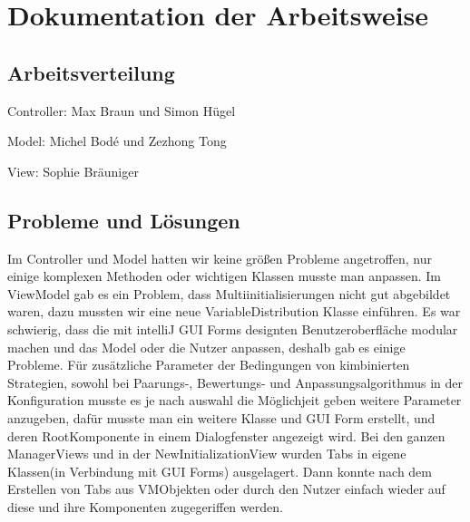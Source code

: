 \section{Dokumentation der Arbeitsweise}


\subsection{Arbeitsverteilung}

Controller: Max Braun und Simon Hügel

Model: Michel Bodé und Zezhong Tong

View: Sophie Bräuniger

\subsection{Probleme und Lösungen}

Im Controller und Model hatten wir keine größen Probleme angetroffen, nur einige komplexen Methoden oder wichtigen Klassen musste man anpassen. Im ViewModel gab es ein Problem, dass Multiinitialisierungen nicht gut abgebildet waren, dazu mussten wir eine neue VariableDistribution Klasse einführen. Es war schwierig, dass die mit intelliJ GUI Forms designten Benutzeroberfläche modular machen und das Model oder die Nutzer anpassen, deshalb gab es einige Probleme. Für zusätzliche Parameter der Bedingungen von kimbinierten Strategien, sowohl bei Paarungs-, Bewertungs- und Anpassungsalgorithmus in der Konfiguration musste es je nach auswahl die Möglichjeit geben weitere Parameter anzugeben, dafür musste man ein weitere Klasse und GUI Form erstellt, und deren RootKomponente in einem Dialogfenster angezeigt wird. Bei den ganzen ManagerViews und in der NewInitializationView wurden Tabs in eigene Klassen(in Verbindung mit GUI Forms) ausgelagert. Dann konnte  nach dem Erstellen von Tabs aus VMObjekten oder durch den Nutzer einfach wieder auf diese und ihre Komponenten zugegeriffen werden.